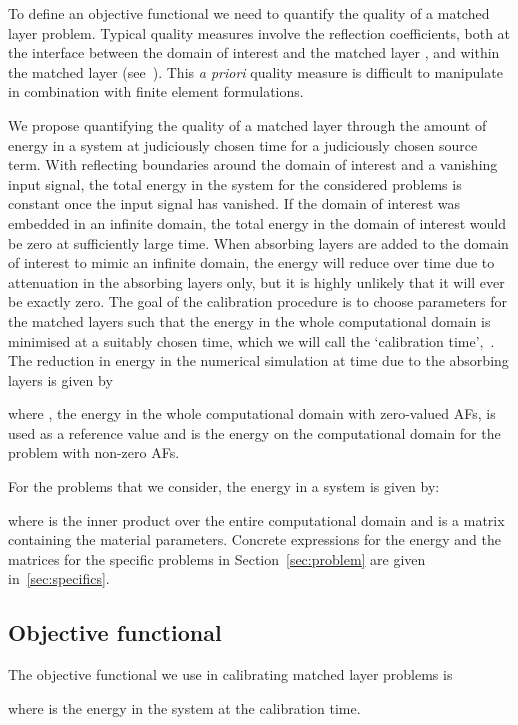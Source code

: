 \documentclass[a4paper]{article}
\begin{document}
To define an objective functional we need to quantify the quality of a
matched layer problem. Typical quality measures involve the reflection
coefficients, both at the interface between the domain of interest
 and the matched layer , and within the matched
layer (see~\citep{chew96jin}). This \emph{a priori} quality measure is
difficult to manipulate in combination with finite element
formulations.

We propose quantifying the quality of a matched layer through the
amount of energy in a system at judiciously chosen time for a
judiciously chosen source term.  With reflecting boundaries around the
domain of interest and a vanishing input signal, the total energy in
the system for the considered problems is constant once the input
signal has vanished. If the domain of interest was embedded in an
infinite domain, the total energy in the domain of interest would be
zero at sufficiently large time. When absorbing layers are added to
the domain of interest to mimic an infinite domain, the energy will
reduce over time due to attenuation in the absorbing layers only, but
it is highly unlikely that it will ever be exactly zero. The goal of
the calibration procedure is to choose parameters for the matched
layers such that the energy in the whole computational domain is
minimised at a suitably chosen time, which we will call the
`calibration time',~.  The reduction in energy in the numerical
simulation at time  due to the absorbing layers is given by

where , the energy in the whole computational domain with
zero-valued AFs, is used as a reference value and  is the energy on
the computational domain for the problem with non-zero AFs.

For the problems that we consider, the energy in a system is given by:

where  is the  inner product over the
entire computational domain  and  is a matrix
containing the material parameters. Concrete expressions for the
energy and the matrices  for the specific problems in
Section~\ref{sec:problem} are given in~\ref{sec:specifics}.

\subsection{Objective functional}
\label{sec:objective}

The objective functional we use in calibrating matched layer problems is

where  is the energy in the system at the calibration time.
\end{document}
